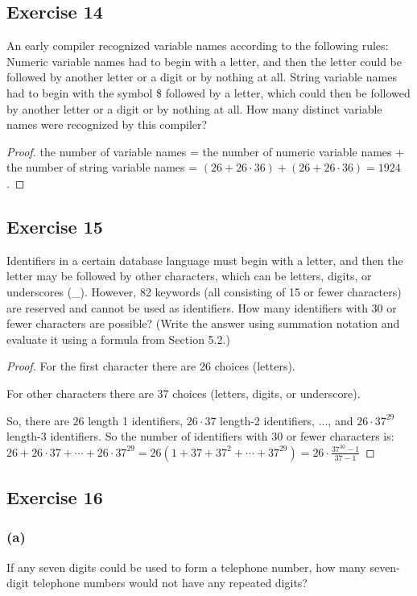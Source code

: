 \documentclass[14pt]{extarticle}
\begin{document}
\subsection{Exercise 14}
An early compiler recognized variable names according to the following rules: Numeric variable names had to begin with a 
letter, and then the letter could be followed by another letter or a digit or by nothing at all. String variable names 
had to begin with the symbol \$ followed by a letter, which could then be followed by another letter or a digit or by 
nothing at all. How many distinct variable names were recognized by this compiler?

\begin{proof}
the number of variable names = the number of numeric variable names + the number of string variable names = 
\((26 + 26 \cdot 36) + (26 + 26 \cdot 36) = 1924\).
\end{proof}

\subsection{Exercise 15}
Identifiers in a certain database language must begin with a letter, and then the letter may be followed by other 
characters, which can be letters, digits, or underscores (\_). However, 82 keywords (all consisting of 15 or fewer 
characters) are reserved and cannot be used as identifiers. How many identifiers with 30 or fewer characters are 
possible? (Write the answer using summation notation and evaluate it using a formula from Section 5.2.)

\begin{proof}
For the first character there are 26 choices (letters).

For other characters there are 37 choices (letters, digits, or underscore).

So, there are \(26\) length 1 identifiers, \(26 \cdot 37\) length-2 identifiers, ..., and \(26 \cdot 37^{29}\) 
length-3 identifiers. So the number of identifiers with 30 or fewer characters is: \\
\(26+26 \cdot 37 + \cdots + 26 \cdot 37^{29} = 26(1+37+37^2+\cdots+37^{29}) = 26 \cdot \frac{37^{30}-1}{37-1}\)
\end{proof}

\subsection{Exercise 16}
\subsubsection{(a)}
If any seven digits could be used to form a telephone number, how many seven-digit telephone numbers would not 
have any repeated digits?
\end{document}
